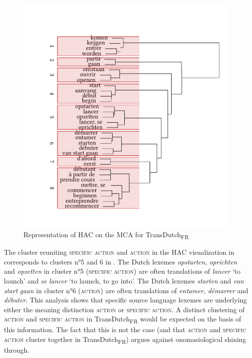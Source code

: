\begin{figure}
\includegraphics[width=\textwidth]{figures/tree93.pdf}
\caption{\label{fig:4:90}Representation of HAC on the MCA for TransDutch\textsubscript{FR}}
\end{figure}

The cluster reuniting {\textsc{specific}} \textsc{action} and \textsc{action} in the HAC visualization in  corresponds to clusters n°5 and 6 in . The Dutch lexemes \textit{opstarten}, \textit{oprichten} and \textit{opzetten} in cluster n°5 ({\textsc{specific}} \textsc{action}) are often translations of \textit{lancer} `to launch' and \textit{se} \textit{lancer} `to launch, to go into'. The Dutch lexemes \textit{starten} and \textit{van} \textit{start} \textit{gaan} in cluster n°6 (\textsc{action}) are often translations of \textit{entamer,} \textit{démarrer} and \textit{débuter}. This analysis shows that specific source language lexemes are underlying either the meaning distinction \textsc{action} or {\textsc{specific}} \textsc{action}. A distinct clustering of \textsc{action} and {\textsc{specific}} \textsc{action} in TransDutch\textsubscript{FR} would be expected on the basis of this information. The fact that this is not the case (and that \textsc{action} and {\textsc{specific}} \textsc{action} cluster together in TransDutch\textsubscript{FR}) argues against onomasiological shining through.

